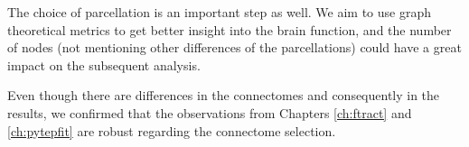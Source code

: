 The choice of parcellation is an important step as well. We aim to use graph theoretical metrics to get better insight into the brain function, and the number of nodes (not mentioning other differences of the parcellations) could have a great impact on the subsequent analysis.

Even though there are differences in the connectomes and consequently in the results, we confirmed that the observations from Chapters \ref{ch:ftract} and \ref{ch:pytepfit} are robust regarding the connectome selection.